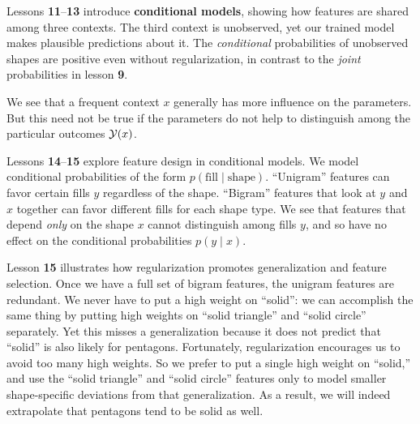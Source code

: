 \documentclass[11pt,letterpaper]{article}
\newcommand{\les}[1]{\textbf{#1}}
\begin{document}
Lessons \les{11}--\les{13} introduce \textbf{conditional models},
showing how features are shared among three contexts.  The third
context is unobserved, yet our trained model makes plausible
predictions about it.  The {\em conditional} probabilities of
unobserved shapes are positive even without regularization, in
contrast to the {\em joint} probabilities in lesson \les{9}.

We see that a frequent context $x$ generally has more influence on the
parameters.  But this need not be true if the parameters do not help
to distinguish among the particular outcomes ${\cal Y}(x)$.


Lessons \les{14}--\les{15} explore feature design in conditional
models.  We model conditional probabilities of the form $p(\text{fill}
\mid \text{shape})$.  ``Unigram'' features can favor certain fills $y$
regardless of the shape.  ``Bigram'' features that look at $y$ and $x$
together can favor different fills for each shape type.  We see that
features that depend {\em only} on the shape $x$ cannot distinguish
among fills $y$, and so have no effect on the conditional
probabilities $p(y\mid x)$.


Lesson \les{15} illustrates how regularization promotes
generalization and feature selection.  Once we have a full set of
bigram features, the unigram features are redundant.  We never have to
put a high weight on ``solid'': we can accomplish the same thing by
putting high weights on ``solid triangle'' and ``solid circle''
separately.  Yet this misses a generalization because it does not
predict that ``solid'' is also likely for pentagons.  Fortunately,
regularization encourages us to avoid too many high weights.  So
we prefer to put a single high weight on ``solid,'' and use
the ``solid triangle'' and ``solid circle'' features only to model
smaller shape-specific deviations from that generalization.  As a
result, we will indeed extrapolate that pentagons tend to be
solid as well.
\end{document}

